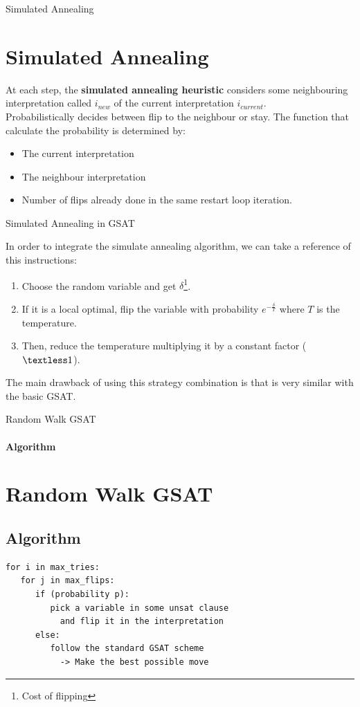 \documentclass{beamer}
\begin{document}
\begin{frame}{Simulated Annealing}
\section{Simulated Annealing}
\begin{flushleft}

At each step, the \textbf{simulated annealing heuristic }considers some neighbouring interpretation called $i_{new}$ of the current interpretation $i_{current}$.
\\
Probabilistically decides between flip to the neighbour or stay. The function that calculate the probability is determined by:
\end{flushleft}
\begin{itemize}
	\item The current interpretation
	\item The neighbour interpretation
	\item Number of flips already done in the same restart loop iteration.
\end{itemize}
\end{frame}
\begin{frame}{Simulated Annealing in GSAT}
\begin{flushleft}
In order to integrate the simulate annealing algorithm, we can take a reference of this instructions:
\end{flushleft}
\begin{enumerate}
	\item Choose the random variable and get $\delta$\footnote{Cost of flipping}.
	\item If it is a local optimal, flip the variable with probability $e^{-\frac{\delta}{T}}$ where $T$ is the temperature.
	\item Then, reduce the temperature multiplying it by a constant factor ($\textless 1$).
\end{enumerate}
\begin{flushleft}
The main drawback of using this strategy combination is that is very similar with the basic GSAT.
\end{flushleft}
\end{frame}

\begin{frame}[fragile]{Random Walk GSAT}
\framesubtitle{Algorithm}
\section{Random Walk GSAT}
\subsection{Algorithm}
\begin{verbatim}
for i in max_tries:
   for j in max_flips:
      if (probability p):
         pick a variable in some unsat clause
           and flip it in the interpretation
      else:
         follow the standard GSAT scheme 
           -> Make the best possible move
\end{verbatim}
\end{frame}
\end{document}
